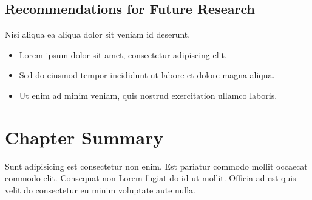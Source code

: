 \subsection{Recommendations for Future Research}
Nisi aliqua ea aliqua dolor sit veniam id deserunt.
\begin{itemize}
  \item Lorem ipsum dolor sit amet, consectetur adipiscing elit.
  \item Sed do eiusmod tempor incididunt ut labore et dolore magna aliqua.
  \item Ut enim ad minim veniam, quis nostrud exercitation ullamco laboris.
\end{itemize}

\section{Chapter Summary}
Sunt adipisicing est consectetur non enim. Est pariatur commodo mollit occaecat commodo elit. Consequat non Lorem fugiat do id ut mollit. Officia ad est quis velit do consectetur eu minim voluptate aute nulla.